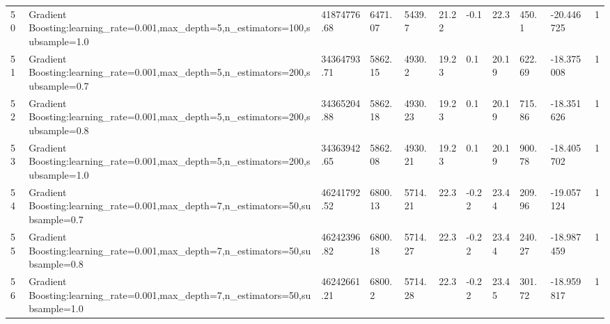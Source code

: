 \begin{longtable}{C{0.8cm} L{2cm} C{1.15cm} C{1.15cm} C{1.15cm} C{1.15cm} C{0.85cm} C{1.25cm} C{1.2cm} C{1.5cm} C{1.0cm}}
50 & Gradient Boosting:\newline learning\_rate=0.001,\newline max\_depth=5,\newline n\_estimators=100,\newline subsample=1.0 & 41874776.68 & 6471.07 & 5439.7 & 21.22 & -0.1 & 22.3 & 450.1 & -20.446725 & 1 \\
51 & Gradient Boosting:\newline learning\_rate=0.001,\newline max\_depth=5,\newline n\_estimators=200,\newline subsample=0.7 & 34364793.71 & 5862.15 & 4930.2 & 19.23 & 0.1 & 20.19 & 622.69 & -18.375008 & 1 \\
52 & Gradient Boosting:\newline learning\_rate=0.001,\newline max\_depth=5,\newline n\_estimators=200,\newline subsample=0.8 & 34365204.88 & 5862.18 & 4930.23 & 19.23 & 0.1 & 20.19 & 715.86 & -18.351626 & 1 \\
53 & Gradient Boosting:\newline learning\_rate=0.001,\newline max\_depth=5,\newline n\_estimators=200,\newline subsample=1.0 & 34363942.65 & 5862.08 & 4930.21 & 19.23 & 0.1 & 20.19 & 900.78 & -18.405702 & 1 \\
54 & Gradient Boosting:\newline learning\_rate=0.001,\newline max\_depth=7,\newline n\_estimators=50,\newline subsample=0.7 & 46241792.52 & 6800.13 & 5714.21 & 22.3 & -0.22 & 23.44 & 209.96 & -19.057124 & 1 \\
55 & Gradient Boosting:\newline learning\_rate=0.001,\newline max\_depth=7,\newline n\_estimators=50,\newline subsample=0.8 & 46242396.82 & 6800.18 & 5714.27 & 22.3 & -0.22 & 23.44 & 240.27 & -18.987459 & 1 \\
56 & Gradient Boosting:\newline learning\_rate=0.001,\newline max\_depth=7,\newline n\_estimators=50,\newline subsample=1.0 & 46242661.21 & 6800.2 & 5714.28 & 22.3 & -0.22 & 23.45 & 301.72 & -18.959817 & 1 \\

\end{longtable}
